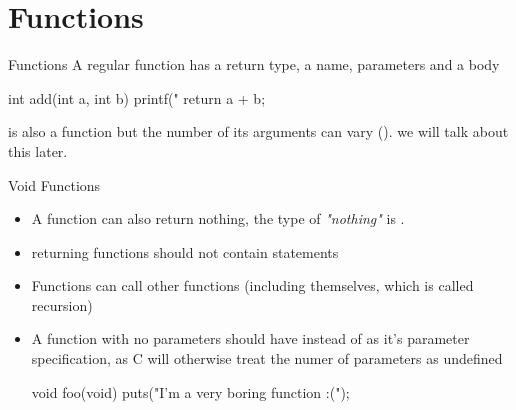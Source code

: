 \documentclass[10pt,graphics,aspectratio=169,table]{beamer}
\begin{document}
\section{Functions}
\begin{frame}[fragile]{Functions}
    A regular function has a return type, a name, parameters and a body
    \begin{codeblock}
int add(int a, int b){
    printf("%
    return a + b;
}
    \end{codeblock}

     is also a function but the number of its arguments 
    can vary (). we will talk about this later.
\end{frame}
\begin{frame}[fragile]{Void Functions}
    \begin{itemize}
       
        \item
            A function can also return nothing,
            the type of \textit{"nothing"} is .
        \item
             returning functions should not 
            contain  statements
        \item 
            Functions can call other functions 
            (including themselves, which is called recursion)
  
        \item 
            A function with no parameters should have  instead of 
            \code{()} as it's parameter specification,
            as C will otherwise treat the numer
            of parameters as undefined
            \begin{codeblock}
void foo(void){
    puts("I'm a very boring function :(");
}
            \end{codeblock}
    \end{itemize}

\end{frame}
\end{document}
